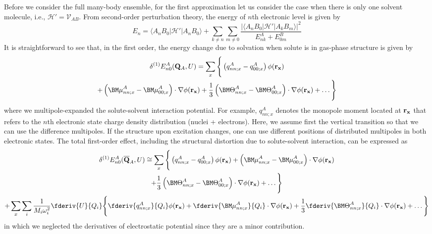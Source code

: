 Before we consider the full many\hyp{}body ensemble, for the first approximation
let us consider the case when there is only
one solvent molecule, i.e., $\mathscr{H}'=\mathscr{V}_{AB}$.
From second\hyp{}order perturbation theory, the energy of $n$th electronic level
is given by
%
\begin{equation}
E_n = \langle A_nB_0 \vert \mathscr{H}' \vert A_nB_0 \rangle 
+ \sum_{k\ne n} \sum_{m\ne 0} \frac{
\lvert \langle A_nB_0 \vert \mathscr{H}' \vert A_kB_m \rangle  \rvert^2
}{E^A_{nk} + E^B_{0m}}
\end{equation}
%
It is straightforward to see that, in the first order, 
the energy change due to solvation when solute is in gas\hyp{}phase
structure is given by
%
\begin{multline}
\delta^{(1)} E^A_{n0}({\bf Q}_A, U) = \sum_{x} \Bigg\{ 
\left( q^A_{nn;x} - q^A_{00;x} \right) \phi({\bf r_x}) \\
+ \left( {\BM \mu}^A_{nn;x} - {\BM \mu}^A_{00;x} \right) \cdot \nabla \phi({\bf r_x})  
+ \frac{1}{3} \left( {\BM \Theta}^A_{nn;x} - {\BM \Theta}^A_{00;x} \right) \cdot \nabla \phi({\bf r_x}) 
+ \ldots
\Bigg\}
\end{multline}
%
where we multipole\hyp{}expanded the solute\hyp{}solvent interaction 
potential. For example, $q^A_{nn;x}$ denotes the monopole moment located at ${\bf r_x}$
that refers to the $n$th electronic state charge density distribution (nuclei + electrons).
Here, we assume first the vertical transition so that we can use the difference multipoles.
If the structure upon excitation changes, one can use different positions 
of distributed multipoles in both electronic states.
The total first\hyp{}order effect, including the structural distortion due to solute-solvent
interaction, can be expressed as
%
\begin{multline}
\delta^{(1)} E^A_{n0}({\bf \overline{Q}}_A, U) \cong \sum_{x} \Bigg\{ 
\left( q^A_{nn;x} - q^A_{00;x} \right) \phi({\bf r_x}) 
+ \left( {\BM \mu}^A_{nn;x} - {\BM \mu}^A_{00;x} \right) \cdot \nabla \phi({\bf r_x})  \\
+ \frac{1}{3} \left( {\BM \Theta}^A_{nn;x} - {\BM \Theta}^A_{00;x} \right) \cdot \nabla \phi({\bf r_x}) 
+ \ldots
\Bigg\} \\
%
+
%
\sum_{x} \sum_i \frac{1}{M_i\omega_i^2} \fderiv{U}{Q_i}
\Bigg\{ 
\fderiv{ q^A_{nn;x} }{Q_i} \phi({\bf r_x}) 
+ \fderiv{  {\BM \mu}^A_{nn;x}}{Q_i} \cdot \nabla \phi({\bf r_x})  
+ \frac{1}{3} \fderiv{ {\BM \Theta}^A_{nn;x} }{Q_i} \cdot \nabla \phi({\bf r_x}) 
+ \ldots
\Bigg\}
\end{multline}
%
in which we neglected the derivatives of electrostatic potential since they are 
a minor contribution.

